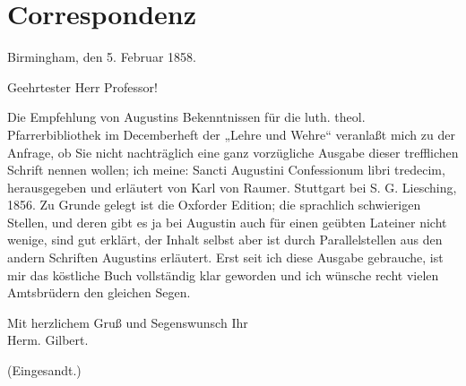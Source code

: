 \chapter{Correspondenz}

\begin{center}
Birmingham, den 5. Februar 1858.
\end{center}

Geehrtester Herr Professor!

Die Empfehlung von Augustins Bekenntnissen für die luth. theol. Pfarrerbibliothek im Decemberheft der „Lehre und Wehre“ veranlaßt mich zu der Anfrage, ob Sie nicht nachträglich eine ganz vorzügliche Ausgabe dieser trefflichen Schrift nennen wollen; ich meine: Sancti Augustini Confessionum libri tredecim, herausgegeben und erläutert von Karl von Raumer. Stuttgart bei S. G. Liesching, 1856. Zu Grunde gelegt ist die Oxforder Edition; die sprachlich schwierigen Stellen, und deren gibt es ja bei Augustin auch für einen geübten Lateiner nicht wenige, sind gut erklärt, der Inhalt selbst aber ist durch Parallelstellen aus den andern Schriften Augustins erläutert. Erst seit ich diese Ausgabe gebrauche, ist mir das köstliche Buch vollständig klar geworden und ich wünsche recht vielen Amtsbrüdern den gleichen Segen.

\begin{unterschrift}
Mit herzlichem Gruß und Segenswunsch Ihr\\
Herm. Gilbert.
\end{unterschrift}

\begin{center}
(Eingesandt.)
\end{center}
